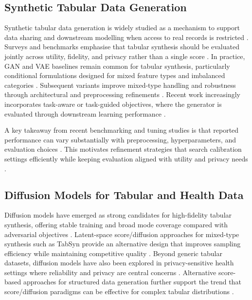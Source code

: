 \documentclass[preprint,12pt]{elsarticle}
\begin{document}
\subsection{Synthetic Tabular Data Generation}\label{sec:rw_tabular}
Synthetic tabular data generation is widely studied as a mechanism to support data sharing and downstream modelling when access to real records is restricted \cite{Kindji2025}. Surveys and benchmarks emphasise that tabular synthesis should be evaluated jointly across utility, fidelity, and privacy rather than a single score \cite{lautrup2024systematic_review_tabular_synthesis_csur}. In practice, GAN and VAE baselines remain common for tabular synthesis, particularly conditional formulations designed for mixed feature types and imbalanced categories \cite{Xu2019a}. Subsequent variants improve mixed-type handling and robustness through architectural and preprocessing refinements \cite{zhao2022ctabganplus_frontiers}. Recent work increasingly incorporates task-aware or task-guided objectives, where the generator is evaluated through downstream learning performance \cite{Jia2024}.

A key takeaway from recent benchmarking and tuning studies is that reported performance can vary substantially with preprocessing, hyperparameters, and evaluation choices \cite{Restrepo2025}. This motivates refinement strategies that search calibration settings efficiently while keeping evaluation aligned with utility and privacy needs \cite{Kindji2025}.

\subsection{Diffusion Models for Tabular and Health Data}\label{sec:rw_diffusion}
Diffusion models have emerged as strong candidates for high-fidelity tabular synthesis, offering stable training and broad mode coverage compared with adversarial objectives \cite{Kotelnikov2023}. Latent-space score/diffusion approaches for mixed-type synthesis such as TabSyn provide an alternative design that improves sampling efficiency while maintaining competitive quality \cite{Zhang2024}. Beyond generic tabular datasets, diffusion models have also been explored in privacy-sensitive health settings where reliability and privacy are central concerns \cite{Tian2024}. Alternative score-based approaches for structured data generation further support the trend that score/diffusion paradigms can be effective for complex tabular distributions \cite{Kim2023}.
\end{document}
